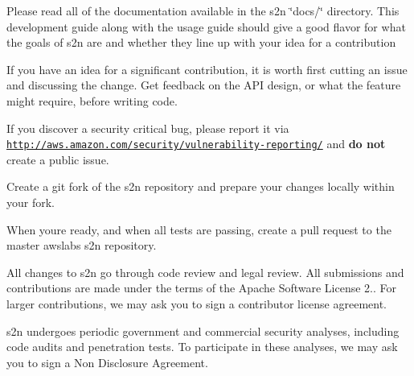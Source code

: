\begin{DoxyItemize}
\item Please read all of the documentation available in the s2n \char`\"{}docs/\char`\"{} directory. This development guide along with the usage guide should give a good flavor for what the goals of s2n are and whether they line up with your idea for a contribution
\item If you have an idea for a significant contribution, it is worth first cutting an issue and discussing the change. Get feedback on the A\+PI design, or what the feature might require, before writing code.
\item If you discover a security critical bug, please report it via \href{http://aws.amazon.com/security/vulnerability-reporting/}{\tt http\+://aws.\+amazon.\+com/security/vulnerability-\/reporting/} and {\bfseries do not} create a public issue.
\item Create a git fork of the s2n repository and prepare your changes locally within your fork.
\item When you\textquotesingle{}re ready, and when all tests are passing, create a pull request to the master awslabs s2n repository.
\item All changes to s2n go through code review and legal review. All submissions and contributions are made under the terms of the Apache Software License 2.. For larger contributions, we may ask you to sign a contributor license agreement.
\item s2n undergoes periodic government and commercial security analyses, including code audits and penetration tests. To participate in these analyses, we may ask you to sign a Non Disclosure Agreement. 
\end{DoxyItemize}